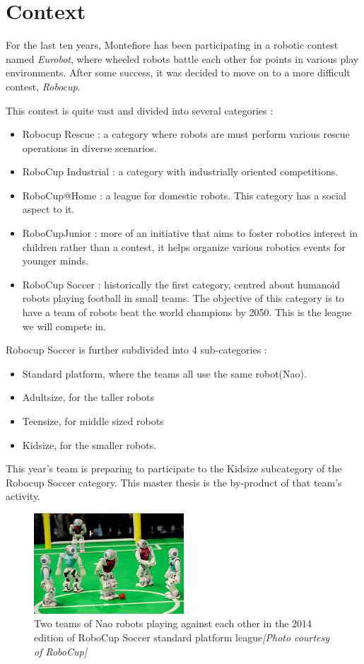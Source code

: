 \section{Context}
For the last ten years, Montefiore has been participating in a robotic contest named \emph{Eurobot}, where wheeled robots battle each other for points in various play environments. After some success, it was decided to move on to a more difficult contest, \emph{Robocup}.

This contest is quite vast and divided into several categories :
\begin{itemize}
\item Robocup Rescue : a category where robots are must perform various rescue operations in diverse scenarios.
\item RoboCup Industrial : a category with industrially oriented competitions.
\item RoboCup@Home : a league for domestic robots. This category has a social aspect to it.
\item RoboCupJunior : more of an initiative that aims to foster robotics interest in children rather than a contest, it helps organize various robotics events for younger minds.
\item RoboCup Soccer : historically the first category, centred about humanoid robots playing football in small teams. The objective of this category is to have a team of robots beat the world champions by 2050. This is the league we will compete in.
\end{itemize}
Robocup Soccer is further subdivided into 4 sub-categories :\begin{itemize}
\item Standard platform, where the teams all use the same robot(Nao).
\item Adultsize, for the taller robots
\item Teensize, for middle sized robots
\item Kidsize, for the smaller robots.
\end{itemize}

This year's team is preparing to participate to the Kidsize subcategory of the Robocup Soccer category. This master thesis is the by-product of that team's activity.

\begin{figure}[htp]
\center
\includegraphics[width=0.5\textwidth]{figures/robocup}
\caption[Robocup Soccer standard platform]{Two teams of Nao robots playing against each other in the 2014 edition of RoboCup Soccer standard platform league\textit{[Photo courtesy of RoboCup]}}
\label{fig:intro_robocup}
\end{figure}

